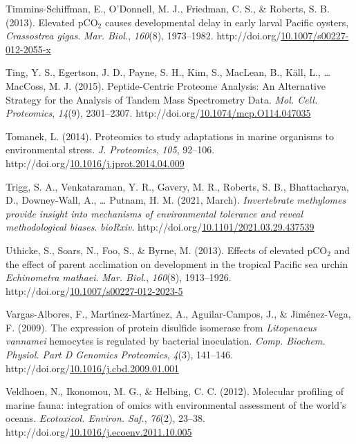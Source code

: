 \documentclass [11pt, proquest] {uwthesis}[2015/03/03]
\newlength{\cslhangindent}
\newenvironment{CSLReferences}%
{\setlength{\parindent}{0pt}%
\everypar{\setlength{\hangindent}{\cslhangindent}}\ignorespaces}%
{\par}
\begin{document}
\begin{CSLReferences}{1}{0}
\leavevmode\hypertarget{ref-Timmins-Schiffman2013}{}%
Timmins-Schiffman, E., O'Donnell, M. J., Friedman, C. S., \& Roberts, S. B. (2013). {Elevated {pCO\(_2\)} causes developmental delay in early larval Pacific oysters, \emph{Crassostrea gigas}}. \emph{Mar. Biol.}, \emph{160}(8), 1973--1982. http://doi.org/\href{https://doi.org/10.1007/s00227-012-2055-x}{10.1007/s00227-012-2055-x}

\leavevmode\hypertarget{ref-Ting2015}{}%
Ting, Y. S., Egertson, J. D., Payne, S. H., Kim, S., MacLean, B., Käll, L., \ldots{} MacCoss, M. J. (2015). {Peptide-Centric Proteome Analysis: An Alternative Strategy for the Analysis of Tandem Mass Spectrometry Data}. \emph{Mol. Cell. Proteomics}, \emph{14}(9), 2301--2307. http://doi.org/\href{https://doi.org/10.1074/mcp.O114.047035}{10.1074/mcp.O114.047035}

\leavevmode\hypertarget{ref-Tomanek2014}{}%
Tomanek, L. (2014). {Proteomics to study adaptations in marine organisms to environmental stress}. \emph{J. Proteomics}, \emph{105}, 92--106. http://doi.org/\href{https://doi.org/10.1016/j.jprot.2014.04.009}{10.1016/j.jprot.2014.04.009}

\leavevmode\hypertarget{ref-Trigg2021}{}%
Trigg, S. A., Venkataraman, Y. R., Gavery, M. R., Roberts, S. B., Bhattacharya, D., Downey-Wall, A., \ldots{} Putnam, H. M. (2021, March). \emph{{Invertebrate methylomes provide insight into mechanisms of environmental tolerance and reveal methodological biases}}. \emph{bioRxiv}. http://doi.org/\href{https://doi.org/10.1101/2021.03.29.437539}{10.1101/2021.03.29.437539}

\leavevmode\hypertarget{ref-Uthicke2013}{}%
Uthicke, S., Soars, N., Foo, S., \& Byrne, M. (2013). {Effects of elevated {pCO\(_2\)} and the effect of parent acclimation on development in the tropical Pacific sea urchin \emph{Echinometra mathaei}}. \emph{Mar. Biol.}, \emph{160}(8), 1913--1926. http://doi.org/\href{https://doi.org/10.1007/s00227-012-2023-5}{10.1007/s00227-012-2023-5}

\leavevmode\hypertarget{ref-Vargas-Albores2009}{}%
Vargas-Albores, F., Martı́nez-Martı́nez, A., Aguilar-Campos, J., \& Jiménez-Vega, F. (2009). {The expression of protein disulfide isomerase from \emph{Litopenaeus vannamei} hemocytes is regulated by bacterial inoculation}. \emph{Comp. Biochem. Physiol. Part D Genomics Proteomics}, \emph{4}(3), 141--146. http://doi.org/\href{https://doi.org/10.1016/j.cbd.2009.01.001}{10.1016/j.cbd.2009.01.001}

\leavevmode\hypertarget{ref-Veldhoen2012}{}%
Veldhoen, N., Ikonomou, M. G., \& Helbing, C. C. (2012). {Molecular profiling of marine fauna: integration of omics with environmental assessment of the world's oceans}. \emph{Ecotoxicol. Environ. Saf.}, \emph{76}(2), 23--38. http://doi.org/\href{https://doi.org/10.1016/j.ecoenv.2011.10.005}{10.1016/j.ecoenv.2011.10.005}


\end{CSLReferences}
\end{document}
